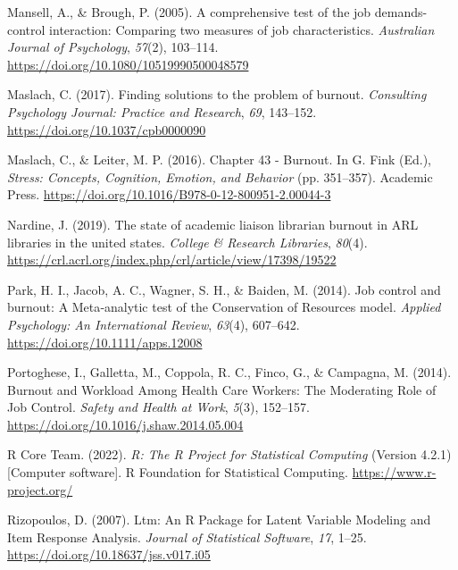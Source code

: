 \documentclass[
  twocolumn]{article}
\newlength{\cslhangindent}
\newenvironment{CSLReferences}[2] %
 {\begin{list}{}{%
  \setlength{\itemindent}{0pt}
  \setlength{\leftmargin}{0pt}
  \setlength{\parsep}{0pt}
  \ifodd #1
   \setlength{\leftmargin}{\cslhangindent}
   \setlength{\itemindent}{-1\cslhangindent}
  \fi
  \setlength{\itemsep}{#2\baselineskip}}}
 {\end{list}}
\begin{document}
\begin{CSLReferences}{1}{0}
Mansell, A., \& Brough, P. (2005). A comprehensive test of the job
demands-control interaction: {Comparing} two measures of job
characteristics. \emph{Australian Journal of Psychology}, \emph{57}(2),
103--114. \url{https://doi.org/10.1080/10519990500048579}

Maslach, C. (2017). Finding solutions to the problem of burnout.
\emph{Consulting Psychology Journal: Practice and Research}, \emph{69},
143--152. \url{https://doi.org/10.1037/cpb0000090}

Maslach, C., \& Leiter, M. P. (2016). Chapter 43 - {Burnout}. In G. Fink
(Ed.), \emph{Stress: {Concepts}, {Cognition}, {Emotion}, and {Behavior}}
(pp. 351--357). {Academic Press}.
\url{https://doi.org/10.1016/B978-0-12-800951-2.00044-3}

Nardine, J. (2019). The state of academic liaison librarian burnout in
{ARL} libraries in the united states. \emph{College \& Research
Libraries}, \emph{80}(4).
\url{https://crl.acrl.org/index.php/crl/article/view/17398/19522}

Park, H. I., Jacob, A. C., Wagner, S. H., \& Baiden, M. (2014). Job
control and burnout: {A Meta}‐analytic test of the {Conservation} of
{Resources} model. \emph{Applied Psychology: An International Review},
\emph{63}(4), 607--642. \url{https://doi.org/10.1111/apps.12008}

Portoghese, I., Galletta, M., Coppola, R. C., Finco, G., \& Campagna, M.
(2014). Burnout and {Workload Among Health Care Workers}: {The
Moderating Role} of {Job Control}. \emph{Safety and Health at Work},
\emph{5}(3), 152--157. \url{https://doi.org/10.1016/j.shaw.2014.05.004}

R Core Team. (2022). \emph{R: {The R Project} for {Statistical
Computing}} (Version 4.2.1) {[}Computer software{]}. {R Foundation for
Statistical Computing}. \url{https://www.r-project.org/}

Rizopoulos, D. (2007). Ltm: {An R Package} for {Latent Variable
Modeling} and {Item Response Analysis}. \emph{Journal of Statistical
Software}, \emph{17}, 1--25. \url{https://doi.org/10.18637/jss.v017.i05}


\end{CSLReferences}
\end{document}
